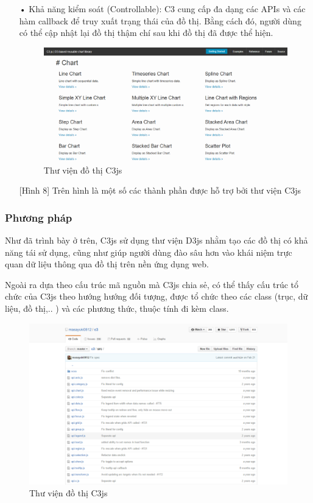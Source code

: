\documentclass[12pt,a4paper,oneside]{article}
\begin{document}
\begin{itemize}
        \item[•]Khả năng kiểm soát (Controllable):
        C3 cung cấp đa dạng các APIs và các hàm callback để truy xuất trạng thái của đồ thị. Bằng cách đó, người dùng có thể cập nhật lại đồ thị thậm chí sau khi đồ thị đã được thể hiện.
\begin{figure}[htp]
    \includegraphics[scale=.4]{image/c3apis}
    \caption{Thư viện đồ thị C3js}
    \label{refhinh8}
\end{figure}
[Hình 8] Trên hình là một số các thành phần được hỗ trợ bởi thư viện C3js
\end{itemize}

\subsubsection{Phương pháp}
Như đã trình bày ở trên, C3js sử dụng thư viện D3js nhằm tạo các đồ thị có khả năng tái sử dụng, cũng như giúp người dùng đào sâu hơn vào khái niệm trực quan dữ liệu thông qua đồ thị trên nền ứng dụng web.

Ngoài ra dựa theo cấu trúc mã nguồn mà C3js chia sẻ, có thể thấy cấu trúc tổ chức của C3js theo hướng hướng đối tượng, được tổ chức theo các class (trục, dữ liệu, đồ thị,.. ) và các phương thức, thuộc tính đi kèm class.

\begin{figure}[htp]
	\begin{center}
    \includegraphics[scale=.4]{image/c3source}
    \caption{Thư viện đồ thị C3js}
    \label{refhinh9}
	\end{center}
\end{figure}
\end{document}
